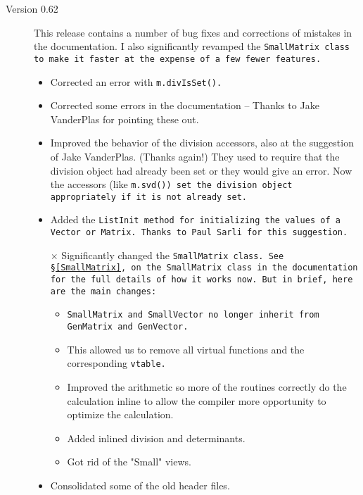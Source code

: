 \begin{description}
\begin{itemize}
\end{itemize}

\item[Version 0.62]

This release contains a number of bug fixes and corrections of mistakes in the documentation.
I also significantly revamped the \tt{SmallMatrix} class to make it faster at the expense of a few fewer features.  

\begin{itemize}

\item
Corrected an error with \tt{m.divIsSet()}.

\item
Corrected some errors in the documentation -- Thanks to Jake VanderPlas for pointing these out.

\item
Improved the behavior of the division accessors, also at the suggestion of Jake VanderPlas. (Thanks again!)  They used to require that the division
object had already been set or they would give an error. Now the accessors (like \tt{m.svd()}) set
the division object appropriately if it is not already set. 

\item
Added the \tt{ListInit} method for initializing the values of a \tt{Vector} or \tt{Matrix}.  Thanks to Paul
Sarli for this suggestion.  

\item[$\times$]
Significantly changed the \tt{SmallMatrix} class.  See \S\ref{SmallMatrix}, on the \tt{SmallMatrix} class 
in the documentation
for the full details of how it works now.  But in brief, here are the main changes:
\begin{itemize}
\item \tt{SmallMatrix} and \tt{SmallVector} no longer inherit from \tt{GenMatrix} and \tt{GenVector}.
\item This allowed us to remove all virtual functions and the corresponding \tt{vtable}.
\item Improved the arithmetic so more of the routines correctly do the calculation inline to allow the
compiler more opportunity to optimize the calculation.
\item Added inlined division and determinants.
\item Got rid of the "Small" views. 
\end{itemize}

\item
Consolidated some of the old header files.  


\end{itemize}
\end{description}
